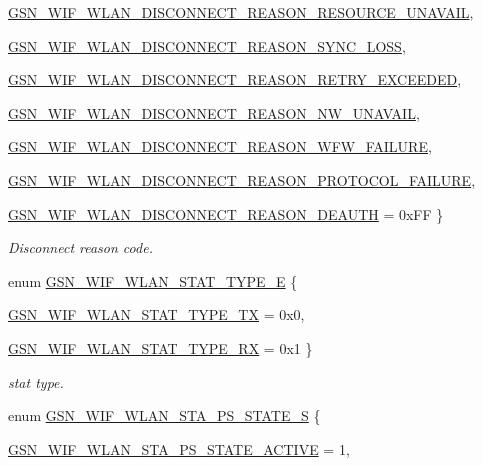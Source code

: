 \begin{DoxyCompactItemize}
\par
\hyperlink{a00640_gga9dd854d0108dc49ff077a04e897e3518aee4dc21ac6db977675d9681fa1f87131}{GSN\_\-WIF\_\-WLAN\_\-DISCONNECT\_\-REASON\_\-RESOURCE\_\-UNAVAIL}, 
\par
\hyperlink{a00640_gga9dd854d0108dc49ff077a04e897e3518a571260d569e804028dc21870862dbf8d}{GSN\_\-WIF\_\-WLAN\_\-DISCONNECT\_\-REASON\_\-SYNC\_\-LOSS}, 
\par
\hyperlink{a00640_gga9dd854d0108dc49ff077a04e897e3518acd39138402c119334dd5f6b3a18ee9c5}{GSN\_\-WIF\_\-WLAN\_\-DISCONNECT\_\-REASON\_\-RETRY\_\-EXCEEDED}, 
\par
\hyperlink{a00640_gga9dd854d0108dc49ff077a04e897e3518a969801072b56d9aa2eb6298b7d79d6fd}{GSN\_\-WIF\_\-WLAN\_\-DISCONNECT\_\-REASON\_\-NW\_\-UNAVAIL}, 
\par
\hyperlink{a00640_gga9dd854d0108dc49ff077a04e897e3518a6e04b4bfeb58c31b2b515f7919275cba}{GSN\_\-WIF\_\-WLAN\_\-DISCONNECT\_\-REASON\_\-WFW\_\-FAILURE}, 
\par
\hyperlink{a00640_gga9dd854d0108dc49ff077a04e897e3518ae0b2465fb829477650a95f708deff7fe}{GSN\_\-WIF\_\-WLAN\_\-DISCONNECT\_\-REASON\_\-PROTOCOL\_\-FAILURE}, 
\par
\hyperlink{a00640_gga9dd854d0108dc49ff077a04e897e3518aedf74ad09bfdcfc5b39c5a36afe860df}{GSN\_\-WIF\_\-WLAN\_\-DISCONNECT\_\-REASON\_\-DEAUTH} = 0xFF
 \}
\begin{DoxyCompactList}\small\item\em Disconnect reason code. \end{DoxyCompactList}\item 
enum \hyperlink{a00677_ga1ea7ef2124a3ae886d909d6b8188ef79}{GSN\_\-WIF\_\-WLAN\_\-STAT\_\-TYPE\_\-E} \{ \par
\hyperlink{a00640_gga1ea7ef2124a3ae886d909d6b8188ef79a04b02ff9d7f0704e049d050172be3433}{GSN\_\-WIF\_\-WLAN\_\-STAT\_\-TYPE\_\-TX} =  0x0, 
\par
\hyperlink{a00640_gga1ea7ef2124a3ae886d909d6b8188ef79a9b06475a178a05d5fea8e190e34e8e08}{GSN\_\-WIF\_\-WLAN\_\-STAT\_\-TYPE\_\-RX} =  0x1
 \}
\begin{DoxyCompactList}\small\item\em stat type. \end{DoxyCompactList}\item 
enum \hyperlink{a00677_gacdd46642c1bc32323d14e63794ffc1b3}{GSN\_\-WIF\_\-WLAN\_\-STA\_\-PS\_\-STATE\_\-S} \{ \par
\hyperlink{a00677_gacdd46642c1bc32323d14e63794ffc1b3a022f4261937d6f0aaca2fb80711bbdab}{GSN\_\-WIF\_\-WLAN\_\-STA\_\-PS\_\-STATE\_\-ACTIVE} = 1, 

\end{DoxyCompactItemize}
